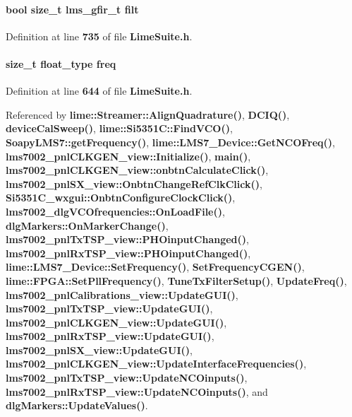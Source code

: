 \paragraph[{filt}]{\setlength{\rightskip}{0pt plus 5cm}bool size\+\_\+t {\bf lms\+\_\+gfir\+\_\+t} filt}\label{group__FN__ADVANCED_gaf8edd4fa11a3af99d15a1d2cf2ef5d9e}


Definition at line {\bf 735} of file {\bf Lime\+Suite.\+h}.

\paragraph[{freq}]{\setlength{\rightskip}{0pt plus 5cm}size\+\_\+t {\bf float\+\_\+type} freq}\label{group__FN__ADVANCED_gaaf6fa8c069646fc0704d9f667dc34e7c}


Definition at line {\bf 644} of file {\bf Lime\+Suite.\+h}.



Referenced by {\bf lime\+::\+Streamer\+::\+Align\+Quadrature()}, {\bf D\+C\+I\+Q()}, {\bf device\+Cal\+Sweep()}, {\bf lime\+::\+Si5351\+C\+::\+Find\+V\+C\+O()}, {\bf Soapy\+L\+M\+S7\+::get\+Frequency()}, {\bf lime\+::\+L\+M\+S7\+\_\+\+Device\+::\+Get\+N\+C\+O\+Freq()}, {\bf lms7002\+\_\+pnl\+C\+L\+K\+G\+E\+N\+\_\+view\+::\+Initialize()}, {\bf main()}, {\bf lms7002\+\_\+pnl\+C\+L\+K\+G\+E\+N\+\_\+view\+::onbtn\+Calculate\+Click()}, {\bf lms7002\+\_\+pnl\+S\+X\+\_\+view\+::\+Onbtn\+Change\+Ref\+Clk\+Click()}, {\bf Si5351\+C\+\_\+wxgui\+::\+Onbtn\+Configure\+Clock\+Click()}, {\bf lms7002\+\_\+dlg\+V\+C\+Ofrequencies\+::\+On\+Load\+File()}, {\bf dlg\+Markers\+::\+On\+Marker\+Change()}, {\bf lms7002\+\_\+pnl\+Tx\+T\+S\+P\+\_\+view\+::\+P\+H\+Oinput\+Changed()}, {\bf lms7002\+\_\+pnl\+Rx\+T\+S\+P\+\_\+view\+::\+P\+H\+Oinput\+Changed()}, {\bf lime\+::\+L\+M\+S7\+\_\+\+Device\+::\+Set\+Frequency()}, {\bf Set\+Frequency\+C\+G\+E\+N()}, {\bf lime\+::\+F\+P\+G\+A\+::\+Set\+Pll\+Frequency()}, {\bf Tune\+Tx\+Filter\+Setup()}, {\bf Update\+Freq()}, {\bf lms7002\+\_\+pnl\+Calibrations\+\_\+view\+::\+Update\+G\+U\+I()}, {\bf lms7002\+\_\+pnl\+Tx\+T\+S\+P\+\_\+view\+::\+Update\+G\+U\+I()}, {\bf lms7002\+\_\+pnl\+C\+L\+K\+G\+E\+N\+\_\+view\+::\+Update\+G\+U\+I()}, {\bf lms7002\+\_\+pnl\+Rx\+T\+S\+P\+\_\+view\+::\+Update\+G\+U\+I()}, {\bf lms7002\+\_\+pnl\+S\+X\+\_\+view\+::\+Update\+G\+U\+I()}, {\bf lms7002\+\_\+pnl\+C\+L\+K\+G\+E\+N\+\_\+view\+::\+Update\+Interface\+Frequencies()}, {\bf lms7002\+\_\+pnl\+Tx\+T\+S\+P\+\_\+view\+::\+Update\+N\+C\+Oinputs()}, {\bf lms7002\+\_\+pnl\+Rx\+T\+S\+P\+\_\+view\+::\+Update\+N\+C\+Oinputs()}, and {\bf dlg\+Markers\+::\+Update\+Values()}.

